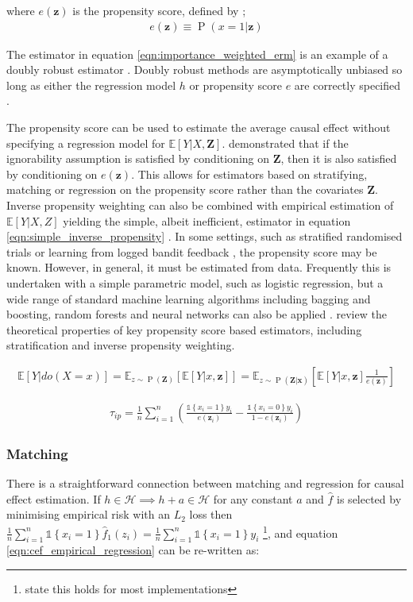 \documentclass[11pt,a4paper,twoside]{report}
\newcommand{\vb}[1]{\boldsymbol{#1}}
\newcommand{\Esub}[2]{\mathbb E_{#1}\left[{#2}\right]}
\newcommand{\E}[1]{\mathbb E\left[{#1}\right]}
\newcommand{\set}[1]{\left\{#1\right\}}
\newcommand{\ind}[1]{\mathds{1}\!\!\set{#1}}
\newcommand{\eqn}[1]{\begin{align}#1\end{align}}
\renewcommand{\P}[1]{\operatorname{P}\left(#1\right)}
\theoremstyle{plain}
\theoremstyle{definition}
\begin{document}
where $e(\vb{z})$ is the propensity score, defined by \citep{Rosenbaum1983};
\eqn{
e(\vb{z})\equiv \P{x=1|\vb{z}}
}

The estimator in equation \ref{eqn:importance_weighted_erm} is an example of a doubly robust estimator \citep{Robins1994a,Kang2007}. Doubly robust methods are asymptotically unbiased so long as either the regression model $h$ or propensity score $e$ are correctly specified \citep{robins1995semiparametric}. 

The propensity score can be used to estimate the average causal effect without specifying a regression model for $\E{Y|X,\vb{Z}}$. \citet{Rosenbaum1983} demonstrated that if the ignorability assumption is satisfied by conditioning on $\vb{Z}$, then it is also satisfied by conditioning on $e(\vb{z})$. This allows for estimators based on stratifying, matching or regression on the propensity score rather than the covariates $\vb{Z}$. Inverse propensity weighting can also be combined with empirical estimation of $\E{Y|X,Z}$ yielding the simple, albeit inefficient, estimator in equation \ref{eqn:simple_inverse_propensity} \citep{Imbens2004}. In some settings, such as stratified randomised trials \citep{imbens2015causal} or learning from logged bandit feedback \citep{Bottou2013}, the propensity score may be known. However, in general, it must be estimated from data. Frequently this is undertaken with a simple parametric model, such as logistic regression, but a wide range of standard machine learning algorithms including bagging and boosting, random forests and neural networks can also be applied   \citep{Austin2011}. \citet{Lunceford2004} review the theoretical properties of key propensity score based estimators, including stratification and inverse propensity weighting. 

\eqn{
\E{Y|do(X=x)} = \Esub{z\sim \P{\vb{Z}}}{\E{Y|x,\vb{z}}} = \Esub{z\sim \P{\vb{Z|x}}}{\E{Y|x,\vb{z}}\frac{1}{e(\vb{z})}}
}

\eqn{
\label{eqn:simple_inverse_propensity}
\hat{\tau}_{ip} = \frac{1}{n}\sum_{i=1}^n \left(\frac{\ind{x_i=1}y_i}{e(\vb{z}_i)} -\frac{\ind{x_i=0}y_i}{1-e(\vb{z}_i)}\right)
}


\subsubsection{Matching}
There is a straightforward connection between matching and regression for causal effect estimation. If $h \in \mathcal{H} \implies h + a \in \mathcal{H}$ for any constant $a$ and $\hat{f}$ is selected by minimising empirical risk with an $L_2$ loss then $\frac{1}{n}\sum_{i=1}^n \ind{x_i=1}\hat{f}_1(z_i) = \frac{1}{n}\sum_{i=1}^n \ind{x_i=1}y_i$ \footnote{\citep{Imbens2004} state this holds for most implementations}, and equation \ref{eqn:cef_empirical_regression} can be re-written as: 
\end{document}
